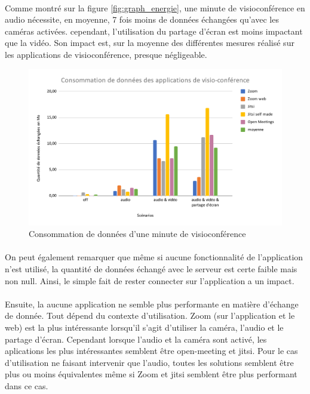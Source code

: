 \documentclass[11pt,a4paper]{report}
\begin{document}
\paragraph{}
Comme montré sur la figure \ref{fig:graph_energie}, une minute de visioconférence en audio nécessite, en moyenne, 7 fois moins de données échangées qu’avec les caméras activées. cependant, l'utilisation du partage d'écran est moins impactant que la vidéo. Son impact est, sur la moyenne des différentes mesures réalisé sur les applications de visioconférence, presque négligeable.

\begin{figure}[h]
  \centering
  \includegraphics[width=1\linewidth]{graph_donnees.pdf}
  \caption{Consommation de données d'une minute de visioconférence}
  \label{fig:graph_donne}
\end{figure}

\paragraph{}
On peut également remarquer que même si aucune fonctionnalité de l'application n'est utilisé, la quantité de données échangé avec le serveur est certe faible mais non null. Ainsi, le simple fait de rester connecter sur l'application a un impact. 

\paragraph{}
Ensuite, la aucune application ne semble plus performante en matière d'échange de donnée. Tout dépend du contexte d'utilisation. Zoom (sur l'application et le web) est la plus intéressante lorsqu'il s'agit d'utiliser la caméra, l'audio et le partage d'écran. Cependant lorsque l'audio et la caméra sont activé, les aplications les plus intéressantes semblent être open-meeting et jitsi. 
Pour le cas d'utilisation ne faisant intervenir que l'audio, toutes les solutions semblent être plus ou moins équivalentes même si Zoom et jitsi semblent être plus performant dans ce cas.
\end{document}
